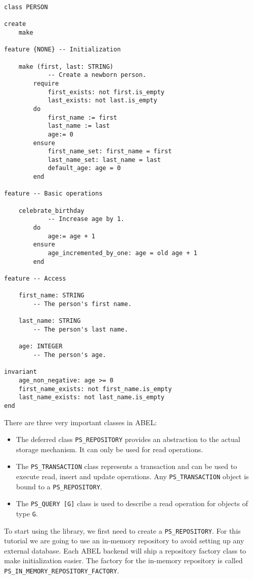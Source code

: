 \documentclass[a4paper,12pt]{report}
\begin{document}
\begin{lstlisting}[language=OOSC2Eiffel, captionpos=b, caption={The PERSON class}, label={lst:person_class}]
class PERSON

create
	make

feature {NONE} -- Initialization

	make (first, last: STRING)
			-- Create a newborn person.
		require
			first_exists: not first.is_empty
			last_exists: not last.is_empty
		do
			first_name := first
			last_name := last
			age:= 0
		ensure
			first_name_set: first_name = first
			last_name_set: last_name = last
			default_age: age = 0
		end

feature -- Basic operations

	celebrate_birthday
			-- Increase age by 1.
		do
			age:= age + 1
		ensure
			age_incremented_by_one: age = old age + 1
		end

feature -- Access

	first_name: STRING
		-- The person's first name.

	last_name: STRING
		-- The person's last name.

	age: INTEGER
		-- The person's age.

invariant
	age_non_negative: age >= 0
	first_name_exists: not first_name.is_empty
	last_name_exists: not last_name.is_empty
end

\end{lstlisting}

There are three very important classes in ABEL:
\begin{itemize}
 \item The deferred class \lstinline!PS_REPOSITORY! provides an abstraction to the actual storage mechanism. It can only be used for read operations.
 \item The \lstinline!PS_TRANSACTION! class represents a transaction and can be used to execute read, insert and update operations. Any \lstinline!PS_TRANSACTION! object is bound to a \lstinline!PS_REPOSITORY!.

 \item The \lstinline!PS_QUERY [G]! class is used to describe a read operation for objects of type \lstinline!G!.

 
\end{itemize}
To start using the library, we first need to create a \lstinline!PS_REPOSITORY!.
For this tutorial we are going to use an in-memory repository to avoid setting up any external database.
Each ABEL backend will ship a repository factory class to make initialization easier.
The factory for the in-memory repository is called \lstinline!PS_IN_MEMORY_REPOSITORY_FACTORY!.
\end{document}
